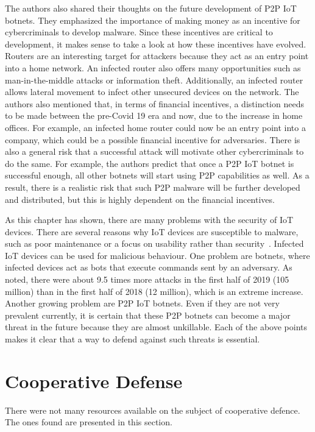 The authors also shared their thoughts on the future development of P2P IoT botnets. They emphasized the importance of making money as an incentive for cybercriminals to develop malware. Since these incentives are critical to development, it makes sense to take a look at how these incentives have evolved.
Routers are an interesting target for attackers because they act as an entry point into a home network. An infected router also offers many opportunities such as man-in-the-middle attacks or information theft. Additionally, an infected router allows lateral movement to infect other unsecured devices on the network. The authors also mentioned that, in terms of financial incentives, a distinction needs to be made between the pre-Covid 19 era and now, due to the increase in home offices. For example, an infected home router could now be an entry point into a company, which could be a possible financial incentive for adversaries. There is also a general risk that a successful attack will motivate other cybercriminals to do the same. For example, the authors predict that once a P2P IoT botnet is successful enough, all other botnets will start using P2P capabilities as well.
As a result, there is a realistic risk that such P2P malware will be further developed and distributed, but this is highly dependent on the financial incentives.

As this chapter has shown, there are many problems with the security of IoT devices. There are several reasons why IoT devices are susceptible to malware, such as poor maintenance or a focus on usability rather than security~\cite{article:DDoSinIoT}. Infected IoT devices can be used for malicious behaviour. One problem are botnets, where infected devices act as bots that execute commands sent by an adversary. As~\cite{website:KasperskyAMalwareStory} noted, there were about 9.5 times more attacks in the first half of 2019 (105 million) than in the first half of 2018 (12 million), which is an extreme increase. Another growing problem are P2P IoT botnets. Even if they are not very prevalent currently, it is certain that these P2P botnets can become a major threat in the future because they are almost unkillable. Each of the above points makes it clear that a way to defend against such threats is essential.



\section{Cooperative Defense}
There were not many resources available on the subject of cooperative defence. The ones found are presented in this section.

